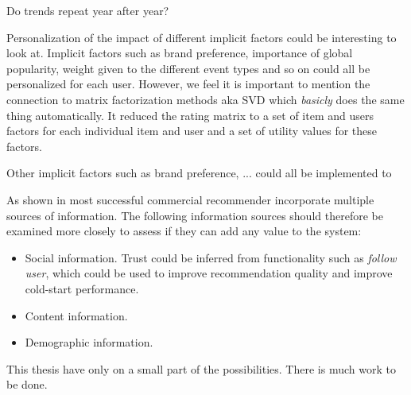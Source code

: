 Do trends repeat year after year?

Personalization of the impact of different implicit factors could be interesting to look at.
Implicit factors such as brand preference, importance of global popularity, weight given
to the different event types and so on could all be personalized for each user.
However, we feel it is important to mention the connection to matrix factorization methods
aka SVD which \emph{basicly} does the same thing automatically. It reduced the rating matrix
to a set of item and users factors for each individual item and user and a set of utility values
for these factors.


Other implicit factors such as brand preference, ... could all be implemented to



As shown in \cite{FranceTelecom} most successful commercial recommender incorporate multiple
sources of information. The following information sources should therefore be examined more
closely to assess if they can add any value to the system:

\begin{itemize}
\item Social information. Trust could be inferred from functionality such as \emph{follow user}, which
	  could be used to improve recommendation quality and improve cold-start performance.
\item Content information.
\item Demographic information.
\end{itemize}



This thesis have only on a small part of the possibilities. There is much work to be done. %

